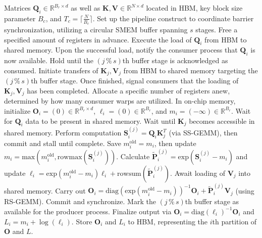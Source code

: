 \begin{algorithm}[H]
    \caption{\small\label{alg:flash3_wgmma_ws_only}\textsc{FlashAttention-3} forward pass \textbf{without} intra-consumer overlapping -- CTA view}
    \begin{algorithmic}[1]
\REQUIRE Matrices $\mathbf{Q}_i \in \mathbb{R}^{B_r \times d}$ as well as $\mathbf{K}, \mathbf{V} \in \mathbb{R}^{N \times d}$ located in HBM, key block size parameter $B_c$, and $T_c = \lceil \frac{N}{B_c} \rceil$.
\STATE Set up the pipeline construct to coordinate barrier synchronization, utilizing a circular SMEM buffer spanning $s$ stages.
\STATE Free a specified amount of registers in advance.
\STATE Execute the load of $\mathbf{Q}_i$ from HBM to shared memory.
\STATE Upon the successful load, notify the consumer process that $\mathbf{Q}_i$ is now available.
    \STATE Hold until the $(j\,\%\,s)$th buffer stage is acknowledged as consumed.
    \STATE Initiate transfers of $\mathbf{K}_j, \mathbf{V}_j$ from HBM to shared memory targeting the $(j\,\%\,s)$th buffer stage.
    \STATE Once finished, signal consumers that the loading of $\mathbf{K}_j, \mathbf{V}_j$ has been completed.
\ENDFOR
\ELSE \STATE Allocate a specific number of registers anew, determined by how many consumer warps are utilized.
\STATE In on-chip memory, initialize $\mathbf{O}_i = (0) \in \mathbb{R}^{B_r \times d}$, $\ell_i = (0) \in \mathbb{R}^{B_r}$, and $m_i = (-\infty) \in \mathbb{R}^{B_r}$.
\STATE Wait for $\mathbf{Q}_i$ data to be present in shared memory.
\STATE Wait until $\mathbf{K}_j$ becomes accessible in shared memory.
\STATE Perform computation $\mathbf{S}_i^{(j)} = \mathbf{Q}_i \mathbf{K}_j^T$ (via SS-GEMM), then commit and stall until complete. \label{alg:ws_only_gemm1}
\STATE Save $m_i^{\mathrm{old}} = m_i$, then update $m_i = \mathrm{max}(m_i^{\mathrm{old}}, \mathrm{rowmax}(\mathbf{S}_i^{(j)}))$. \label{code-ws:softmax_start}
\STATE Calculate $\widetilde{\mathbf{P}}_i^{(j)} = \mathrm{exp}(\mathbf{S}_i^{(j)} - m_i)$ and update $\ell_i = \mathrm{exp}(m_i^{\mathrm{old}} - m_i) \ell_i + \mathrm{rowsum}(\widetilde{\mathbf{P}}_i^{(j)})$. \label{code-ws:softmax_end}
\STATE Await loading of $\mathbf{V}_j$ into shared memory.
\STATE Carry out $\mathbf{O}_i = \mathrm{diag}(\mathrm{exp}(m_i^{\mathrm{old}} - m_i))^{-1} \mathbf{O}_i + \widetilde{\mathbf{P}}_i^{(j)} \mathbf{V}_j$ (using RS-GEMM). Commit and synchronize. \label{alg:ws_only_gemm2}
\STATE Mark the $(j\,\%\,s)$th buffer stage as available for the producer process.
\ENDFOR
\STATE Finalize output via $\mathbf{O}_i = \mathrm{diag}(\ell_i)^{-1} \mathbf{O}_i$ and $L_i = m_i + \log(\ell_i)$.
\STATE Store $\mathbf{O}_i$ and $L_i$ to HBM, representing the $i$th partition of $\mathbf{O}$ and $L$.
\ENDIF
\end{algorithmic}
\end{algorithm}

